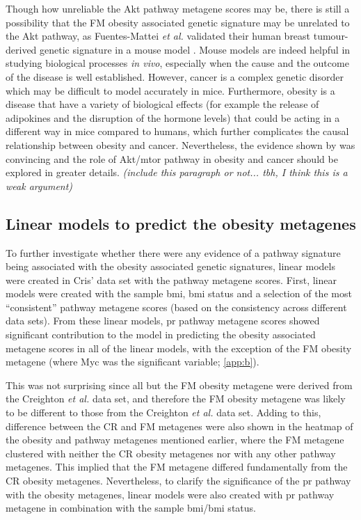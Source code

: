 Though how unreliable the Akt pathway metagene scores may be, there is still a possibility that the FM obesity associated genetic signature may be unrelated to the Akt pathway, as Fuentes-Mattei \textit{et al.} validated their human breast tumour-derived genetic signature in a mouse model \citep{Fuentes-Mattei2014}.
Mouse models are indeed helpful in studying biological processes \textit{in vivo}, especially when the cause and the outcome of the disease is well established.
However, cancer is a complex genetic disorder which may be difficult to model accurately in mice.
Furthermore, obesity is a disease that have a variety of biological effects (for example the release of adipokines and the disruption of the hormone levels) that could be acting in a different way in mice compared to humans, which further complicates the causal relationship between obesity and cancer.
Nevertheless, the evidence shown by \citet{Fuentes-Mattei2014} was convincing and the role of Akt/\gls{mtor} pathway in obesity and cancer should be explored in greater details.
\textit{(include this paragraph or not... tbh, I think this is a weak argument)}

\subsection{Linear models to predict the obesity metagenes}
\label{sub:linear_models_to_predict_obesity_metagenes}

To further investigate whether there were any evidence of a pathway signature being associated with the obesity associated genetic signatures, linear models were created in Cris' data set with the pathway metagene scores.
First, linear models were created with the sample \gls{bmi}, \gls{bmi} status and a selection of the most ``consistent'' pathway metagene scores (based on the consistency across different data sets).
From these linear models, \gls{pr} pathway metagene scores showed significant contribution to the model in predicting the obesity associated metagene scores in all of the linear models, with the exception of the FM obesity metagene (where Myc was the significant variable; \cref{app:b}).

This was not surprising since all but the FM obesity metagene were derived from the Creighton \textit{et al.} data set, and therefore the FM obesity metagene was likely to be different to those from the Creighton \textit{et al.} data set.
Adding to this, difference between the CR and FM metagenes were also shown in the heatmap of the obesity and pathway metagenes mentioned earlier, where the FM metagene clustered with neither the CR obesity metagenes nor with any other pathway metagenes.
This implied that the FM metagene differed fundamentally from the CR obesity metagenes.
Nevertheless, to clarify the significance of the \gls{pr} pathway with the obesity metagenes, linear models were also created with \gls{pr} pathway metagene in combination with the sample \gls{bmi}/\gls{bmi} status.

